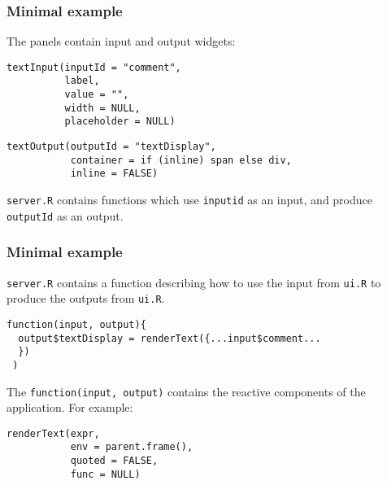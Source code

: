 \documentclass{beamer}
\begin{document}
	\begin{frame}[fragile]
		\frametitle{Minimal example}

		The panels contain input and output widgets:

		\vspace{1em}
		
		\begin{exampleblock}{}
		\begin{BVerbatim}
textInput(inputId = "comment",
          label,
          value = "",
          width = NULL,
          placeholder = NULL)
		\end{BVerbatim}
		\end{exampleblock}{}

		\vspace{1em}

		\begin{exampleblock}{}
		\begin{BVerbatim}
textOutput(outputId = "textDisplay",
           container = if (inline) span else div,
           inline = FALSE)
		\end{BVerbatim}
		\end{exampleblock}{}

		\vspace{1em}

		\verb|server.R| contains functions which use \verb|inputid|	as an input, and produce \verb|outputId| as an output.

	\end{frame}

	\begin{frame}[fragile]
		\frametitle{Minimal example}

		\verb|server.R| contains a function describing how to use the input from \verb|ui.R| to produce the outputs from \verb|ui.R|.

		\vspace{1em}
		
		\begin{exampleblock}{}
		\begin{BVerbatim}
function(input, output){
  output$textDisplay = renderText({...input$comment...
  })
 )
		\end{BVerbatim}
		\end{exampleblock}{}

		\vspace{1em}

		The \verb|function(input, output)| contains the reactive components of the application. For example:
		
		\begin{exampleblock}{}
		\begin{BVerbatim}
renderText(expr,
           env = parent.frame(),
           quoted = FALSE,
           func = NULL)
		\end{BVerbatim}
		\end{exampleblock}{}

	\end{frame}
\end{document}
